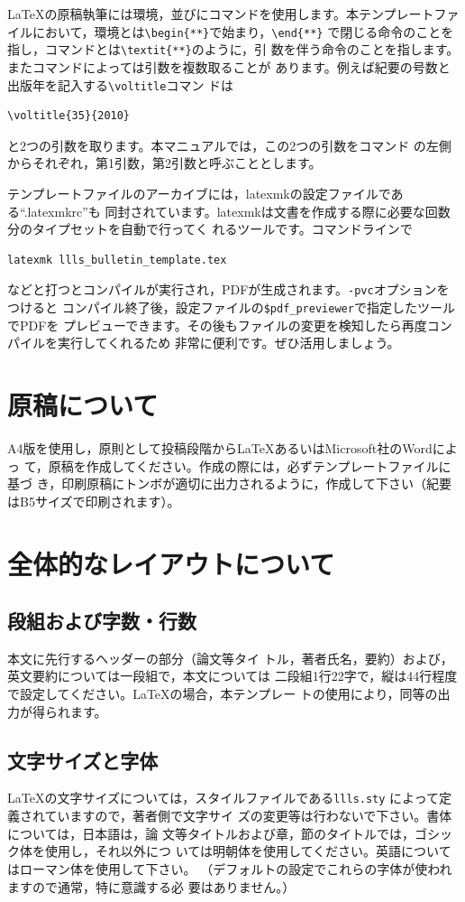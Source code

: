 \documentclass[b5paper,10pt,twocolumn,tombow]{jarticle}
\begin{document}
\LaTeX{}の原稿執筆には環境，並びにコマンドを使用します。本テンプレートファ
イルにおいて，環境とは\verb|\begin{**}|で始まり，\verb|\end{**}|
で閉じる命令のことを指し，コマンドとは\verb|\textit{**}|のように，引
数を伴う命令のことを指します。またコマンドによっては引数を複数取ることが
あります。例えば紀要の号数と出版年を記入する\verb|\voltitle|コマン
ドは
\begin{verbatim}
\voltitle{35}{2010}
\end{verbatim}
と2つの引数を取ります。本マニュアルでは，この2つの引数をコマンド
の左側からそれぞれ，第1引数，第2引数と呼ぶこととします。

テンプレートファイルのアーカイブには，latexmkの設定ファイルである``.latexmkrc''も
同封されています。latexmkは文書を作成する際に必要な回数分のタイプセットを自動で行ってく
れるツールです。コマンドラインで
\begin{verbatim}
latexmk llls_bulletin_template.tex
\end{verbatim}
などと打つとコンパイルが実行され，PDFが生成されます。\verb|-pvc|オプションをつけると
コンパイル終了後，設定ファイルの\verb|$pdf_previewer|で指定したツールでPDFを
プレビューできます。その後もファイルの変更を検知したら再度コンパイルを実行してくれるため
非常に便利です。ぜひ活用しましょう。

\section{原稿について}
A4版を使用し，原則として投稿段階から\LaTeX{}あるいはMicrosoft社のWordによっ
て，原稿を作成してください。作成の際には，必ずテンプレートファイルに基づ
き，印刷原稿にトンボが適切に出力されるように，作成して下さい（紀要
はB5サイズで印刷されます）。

\section{全体的なレイアウトについて}
\subsection{段組および字数・行数}

本文に先行するヘッダーの部分（論文等タイ
トル，著者氏名，要約）および，英文要約については一段組で，本文については
二段組1行22字で，縦は44行程度で設定してください。\LaTeX{}の場合，本テンプレー
トの使用により，同等の出力が得られます。


\subsection{文字サイズと字体}
\LaTeX{}の文字サイズについては，スタイルファイルである\texttt{llls.sty}
によって定義されていますので，著者側で文字サイ
ズの変更等は行わないで下さい。書体については，日本語は，論
文等タイトルおよび章，節のタイトルでは，ゴシック体を使用し，それ以外につ
いては明朝体を使用してください。英語についてはローマン体を使用して下さい。
（デフォルトの設定でこれらの字体が使われますので通常，特に意識する必
要はありません。）
\end{document}
